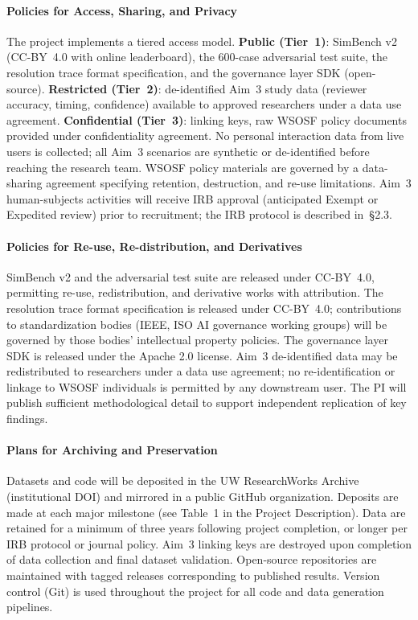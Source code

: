\paragraph{Policies for Access, Sharing, and Privacy}

The project implements a tiered access model. \textbf{Public (Tier~1)}: SimBench v2 (CC-BY~4.0 with online leaderboard), the 600-case adversarial test suite, the resolution trace format specification, and the governance layer SDK (open-source). \textbf{Restricted (Tier~2)}: de-identified Aim~3 study data (reviewer accuracy, timing, confidence) available to approved researchers under a data use agreement. \textbf{Confidential (Tier~3)}: linking keys, raw WSOSF policy documents provided under confidentiality agreement. No personal interaction data from live users is collected; all Aim~3 scenarios are synthetic or de-identified before reaching the research team. WSOSF policy materials are governed by a data-sharing agreement specifying retention, destruction, and re-use limitations. Aim~3 human-subjects activities will receive IRB approval (anticipated Exempt or Expedited review) prior to recruitment; the IRB protocol is described in~\S2.3.

\paragraph{Policies for Re-use, Re-distribution, and Derivatives}

SimBench v2 and the adversarial test suite are released under CC-BY~4.0, permitting re-use, redistribution, and derivative works with attribution. The resolution trace format specification is released under CC-BY~4.0; contributions to standardization bodies (IEEE, ISO AI governance working groups) will be governed by those bodies' intellectual property policies. The governance layer SDK is released under the Apache 2.0 license. Aim~3 de-identified data may be redistributed to researchers under a data use agreement; no re-identification or linkage to WSOSF individuals is permitted by any downstream user. The PI will publish sufficient methodological detail to support independent replication of key findings.

\paragraph{Plans for Archiving and Preservation}

Datasets and code will be deposited in the UW ResearchWorks Archive (institutional DOI) and mirrored in a public GitHub organization. Deposits are made at each major milestone (see Table~1 in the Project Description). Data are retained for a minimum of three years following project completion, or longer per IRB protocol or journal policy. Aim~3 linking keys are destroyed upon completion of data collection and final dataset validation. Open-source repositories are maintained with tagged releases corresponding to published results. Version control (Git) is used throughout the project for all code and data generation pipelines.

